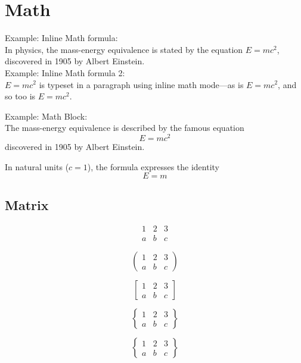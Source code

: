 \chapter{Math}


Example: Inline Math formula:  \\

In physics, the mass-energy equivalence is stated 
by the equation $E=mc^2$, discovered in 1905 by Albert Einstein. \\


Example: Inline Math formula 2: \\

\begin{math}
	E=mc^2
\end{math} is typeset in a paragraph using inline math mode---as is $E=mc^2$, and so too is \(E=mc^2\).

Example: Math Block: \\

The mass-energy equivalence is described by the famous equation
\[ E=mc^2 \] discovered in 1905 by Albert Einstein. 

In natural units ($c = 1$), the formula expresses the identity
\begin{equation}
	E=m
\end{equation}


\section{Matrix}

\[
\begin{matrix}
	1 & 2 & 3\\
	a & b & c
\end{matrix}
\]

\[
\begin{pmatrix}
	1 & 2 & 3\\
	a & b & c
\end{pmatrix}
\]

\[
\begin{bmatrix}
	1 & 2 & 3\\
	a & b & c
\end{bmatrix}
\]

\[
\begin{Bmatrix}
	1 & 2 & 3\\
	a & b & c
\end{Bmatrix}
\]

\[
\begin{Bmatrix}
	1 & 2 & 3\\
	a & b & c
\end{Bmatrix}
\]

